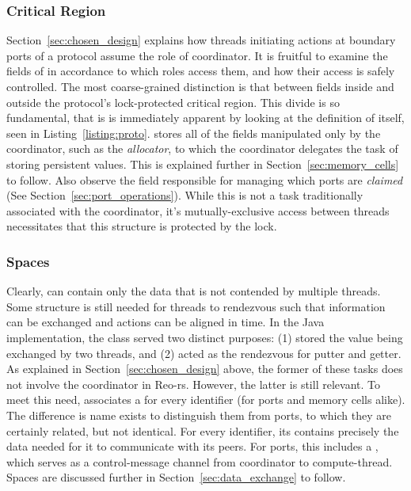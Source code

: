 \subsubsection{Critical Region}
Section~\ref{sec:chosen_design} explains how threads initiating actions at boundary ports of a protocol assume the role of coordinator. It is fruitful to examine the fields of  in accordance to which roles access them, and how their access is safely controlled. The most coarse-grained distinction is that between fields inside and outside the protocol's lock-protected critical region. This divide is so fundamental, that is is immediately apparent by looking at the definition of  itself, seen in Listing~\ref{listing:proto}.  stores all of the fields manipulated only by the coordinator, such as the \textit{allocator}, to which the coordinator delegates the task of storing persistent values. This is explained further in Section~\ref{sec:memory_cells} to follow. Also observe the field responsible for managing which ports are \textit{claimed} (See Section~\ref{sec:port_operations}). While this is not a task traditionally associated with the coordinator, it's mutually-exclusive access between threads necessitates that this structure is protected by the lock.

\subsubsection{Spaces}
Clearly,  can contain only the data that is not contended by multiple threads. Some structure is still needed for threads to rendezvous such that information can be exchanged and actions can be aligned in time. In the Java implementation, the class  served two distinct purposes: (1) stored the value being exchanged by two threads, and (2) acted as the rendezvous for putter and getter. As explained in Section~\ref{sec:chosen_design} above, the former of these tasks does not involve the coordinator in Reo-rs. However, the latter is still relevant. To meet this need,  associates a  for every identifier (for ports and memory cells alike). The difference is name exists to distinguish them from ports, to which they are certainly related, but not identical. For every identifier, its  contains precisely the data needed for it to communicate with its peers. For ports, this includes a , which serves as a control-message channel from coordinator to compute-thread. Spaces are discussed further in Section~\ref{sec:data_exchange} to follow. 

